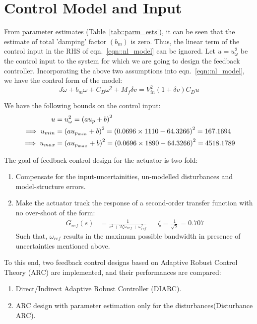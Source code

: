 \section{Control Model and Input}
From parameter estimates (Table~\ref{tab::parm_ests}), it can be seen that the
estimate of total 'damping' factor $( b_m )$ is zero. Thus, the linear term of
the control input in the RHS of eqn.~\ref{eqn::nl_model} can be ignored.
Let $u = u_\omega ^2 $ be the control input to the system for which we are going
to design the feedback controller. Incorporating the above two assumptions into
eqn.~\ref{eqn::nl_model}, we have the control form of the model:
\begin{equation} \label{eqn::control_form}
    J \dot \omega + b_m \omega + C_D \omega^2 + M_f \delta v = V_{in}^2 (1 + \delta v) C_D u
\end{equation}

We have the following bounds on the control input:
\begin{align*}
    u &= u_\omega^2 = \left( a u_p + b \right)^2\\
    \implies u_{min} &= \left( a u_{p_{min}}  + b \right)^2 = \left( 0.0696 \times 1110 - 64.3266 \right)^2 = 167.1694\\
    \implies u_{max} &= \left( a u_{p_{max}}  + b \right)^2 = \left( 0.0696 \times 1890 - 64.3266 \right)^2 = 4518.1789\\
\end{align*}

The goal of feedback control design for the actuator is two-fold:
\begin{enumerate}
\item Compensate for the input-uncertainities, un-modelled disturbances and
model-structure errors.
\item Make the actuator track the response of a second-order transfer function
with no over-shoot of the form:
\begin{align*}
    G_{ref}(s) &= \frac{1}{s^2 + 2 \zeta \omega_{ref} + \omega_{ref}^2}
    && \zeta = \frac{1}{\sqrt{2}} = 0.707
\end{align*}
Such that, $\omega_{ref}$ results in the maximum possible bandwidth in presence
of uncertainties mentioned above.
\end{enumerate}

To this end, two feedback control designs based on Adaptive Robust Control
Theory (ARC) are implemented, and their performances are compared:
\begin{enumerate}
    \item Direct/Indirect Adaptive Robust Controller (DIARC).
    \item ARC design with parameter estimation only for the disturbances(Disturbance ARC).
\end{enumerate}

